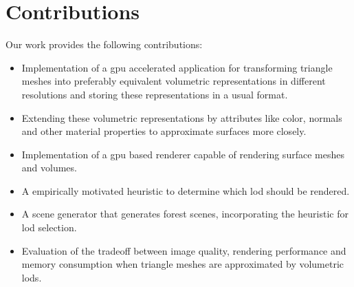 \section{Contributions}
Our work provides the following contributions:
\begin{itemize}
    \item Implementation of a \ac{gpu} accelerated application for transforming triangle meshes into preferably equivalent volumetric representations in different resolutions and storing these representations in a usual format.
    \item Extending these volumetric representations by attributes like color, normals and other material properties to approximate surfaces more closely.
    \item Implementation of a \ac{gpu} based renderer capable of rendering surface meshes and volumes.
    \item A empirically motivated heuristic to determine which \ac{lod} should be rendered.
    \item A scene generator that generates forest scenes, incorporating the heuristic for \ac{lod} selection.
    \item Evaluation of the tradeoff between image quality, rendering performance and memory consumption when triangle meshes are approximated by volumetric \acsp{lod}.
\end{itemize}
